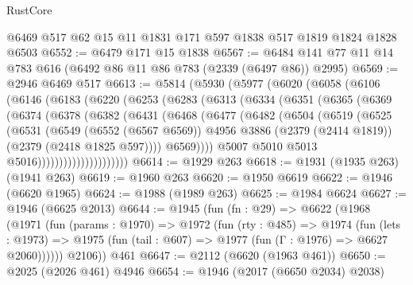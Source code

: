 \begin{lexlean}{RustCore}
\begin{coremodule}
    @6469
    @517
    @62
    @15
    @11
    @1831
    @171
    @597
    @1838
    @517
    @1819
    @1824
    @1828
    @6503
@6552 := @6479 @171 @15 @1838
@6567 := @6484 @141 @77 @11 @14 @783 @616 (@6492 @86 @11 @86 @783 (@2339 (@6497 @86)) @2995)
@6569 := @2946 @6469 @517
@6613 := @5814
    (@5930
      (@5977
        (@6020
          (@6058
            (@6106
              (@6146
                (@6183
                  (@6220
                    (@6253
                      (@6283
                        (@6313
                          (@6334
                            (@6351
                              (@6365
                                (@6369
                                  (@6374
                                    (@6378
                                      (@6382
                                        (@6431
                                          (@6468
                                            (@6477
                                              (@6482
                                                (@6504
                                                  (@6519
                                                    (@6525
                                                      (@6531
                                                        (@6549
                                                          (@6552 (@6567 @6569))
                                                          @4956
                                                          @3886
                                                          (@2379 (@2414 @1819))
                                                          (@2379 (@2418 @1825 @597))))
                                                      @6569))))
                                              @5007
                                              @5010
                                              @5013
                                              @5016)))))))))))))))))))))
@6614 := @1929 @263
@6618 := @1931 (@1935 @263) (@1941 @263)
@6619 := @1960 @263
@6620 := @1950 @6619
@6622 := @1946 (@6620 @1965)
@6624 := @1988 (@1989 @263)
@6625 := @1984 @6624
@6627 := @1946 (@6625 @2013)
@6644 := @1945
    (fun (fn : @29) =>
    @6622
      (@1968
        (@1971
          (fun (params : @1970) =>
          @1972
            (fun (rty : @485) =>
            @1974
              (fun (lets : @1973) =>
              @1975 (fun (tail : @607) => @1977 (fun (Γ : @1976) => @6627 @2060))))))
        @2106))
    @461
@6647 := @2112 (@6620 (@1963 @461))
@6650 := @2025 (@2026 @461) @4946
@6654 := @1946 (@2017 (@6650 @2034) @2038)

\end{coremodule}
\end{lexlean}
